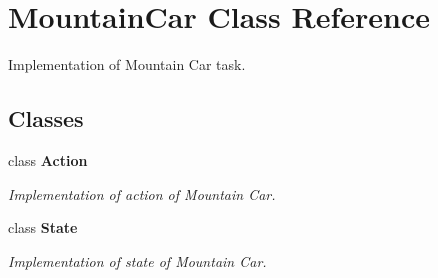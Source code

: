 \section{Mountain\+Car Class Reference}
\label{classmlpack_1_1rl_1_1MountainCar}


Implementation of Mountain Car task.  


\subsection*{Classes}
\begin{DoxyCompactItemize}
\item 
class \textbf{ Action}
\begin{DoxyCompactList}\small\item\em Implementation of action of Mountain Car. \end{DoxyCompactList}\item 
class \textbf{ State}
\begin{DoxyCompactList}\small\item\em Implementation of state of Mountain Car. \end{DoxyCompactList}\end{DoxyCompactItemize}
